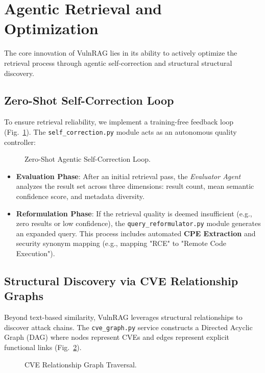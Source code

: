 \section{Agentic Retrieval and Optimization}
\label{sec:optimization}

The core innovation of VulnRAG lies in its ability to actively optimize the retrieval process through agentic self-correction and structural structural discovery.

\subsection{Zero-Shot Self-Correction Loop}
To ensure retrieval reliability, we implement a training-free feedback loop (Fig.~\ref{fig:self_correction}). The \texttt{self\_correction.py} module acts as an autonomous quality controller:

\begin{figure}[htbp]
    \centering
    \resizebox{\columnwidth}{!}{}
    \caption{Zero-Shot Agentic Self-Correction Loop.}
    \label{fig:self_correction}
\end{figure}

\begin{itemize}
    \item \textbf{Evaluation Phase}: After an initial retrieval pass, the \textit{Evaluator Agent} analyzes the result set across three dimensions: result count, mean semantic confidence score, and metadata diversity.
    \item \textbf{Reformulation Phase}: If the retrieval quality is deemed insufficient (e.g., zero results or low confidence), the \texttt{query\_reformulator.py} module generates an expanded query. This process includes automated \textbf{CPE Extraction} and security synonym mapping (e.g., mapping "RCE" to "Remote Code Execution").
\end{itemize}

\subsection{Structural Discovery via CVE Relationship Graphs}
Beyond text-based similarity, VulnRAG leverages structural relationships to discover attack chains. The \texttt{cve\_graph.py} service constructs a Directed Acyclic Graph (DAG) where nodes represent CVEs and edges represent explicit functional links (Fig.~\ref{fig:graph}).

\begin{figure}[htbp]
    \centering
    \resizebox{\columnwidth}{!}{}
    \caption{CVE Relationship Graph Traversal.}
    \label{fig:graph}
\end{figure}

